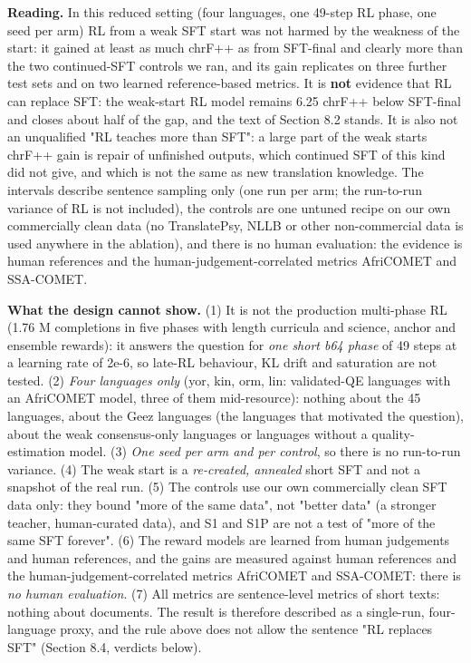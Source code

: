 \textbf{Reading.} In this reduced setting (four languages, one 49-step RL phase, one seed per arm) RL from a weak SFT start was not harmed by the weakness of the start: it gained at least as much chrF++ as from SFT-final and clearly more than the two continued-SFT controls we ran, and its gain replicates on three further test sets and on two learned reference-based metrics. It is \textbf{not} evidence that RL can replace SFT: the weak-start RL model remains 6.25 chrF++ below SFT-final and closes about half of the gap, and the text of Section 8.2 stands. It is also not an unqualified "RL teaches more than SFT": a large part of the weak start\textquotesingle s chrF++ gain is repair of unfinished outputs, which continued SFT of this kind did not give, and which is not the same as new translation knowledge. The intervals describe sentence sampling only (one run per arm; the run-to-run variance of RL is not included), the controls are one untuned recipe on our own commercially clean data (no TranslatePsy, NLLB or other non-commercial data is used anywhere in the ablation), and there is no human evaluation: the evidence is human references and the human-judgement-correlated metrics AfriCOMET and SSA-COMET.

\textbf{What the design cannot show.} (1) It is not the production multi-phase RL (1.76 M completions in five phases with length curricula and science, anchor and ensemble rewards): it answers the question for \emph{one short b64 phase} of 49 steps at a learning rate of 2e-6, so late-RL behaviour, KL drift and saturation are not tested. (2) \emph{Four languages only} (yor, kin, orm, lin: validated-QE languages with an AfriCOMET model, three of them mid-resource): nothing about the 45 languages, about the Ge\textquotesingle ez languages (the languages that motivated the question), about the weak consensus-only languages or languages without a quality-estimation model. (3) \emph{One seed per arm and per control}, so there is no run-to-run variance. (4) The weak start is a \emph{re-created, annealed} short SFT and not a snapshot of the real run. (5) The controls use our own commercially clean SFT data only: they bound "more of the same data", not "better data" (a stronger teacher, human-curated data), and S1 and S1P are not a test of "more of the same SFT forever". (6) The reward models are learned from human judgements and human references, and the gains are measured against human references and the human-judgement-correlated metrics AfriCOMET and SSA-COMET: there is \emph{no human evaluation}. (7) All metrics are sentence-level metrics of short texts: nothing about documents. The result is therefore described as a single-run, four-language proxy, and the rule above does not allow the sentence "RL replaces SFT" (Section 8.4, verdicts below).

